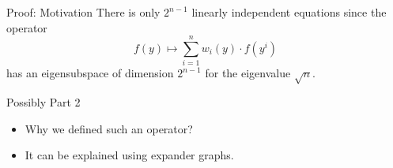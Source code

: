 \documentclass[aspectratio=169,professionalfonts]{beamer}
\begin{document}
\begin{frame}{Proof: Motivation}
    There is only $2^{n-1}$ linearly independent equations since the operator
    \begin{equation*}
        f(y) \mapsto \sum\limits_{i=1}^n w_i(y) \cdot f(y^i)
    \end{equation*}
    has an eigensubspace of dimension $2^{n-1}$ for the eigenvalue $\sqrt{n}$.
\end{frame}

\begin{frame}{Possibly Part 2}
    \begin{itemize}
        \item<1-> Why we defined such an operator?
        \item<2-> It can be explained using expander graphs.
    \end{itemize}
\end{frame}


\end{document}

